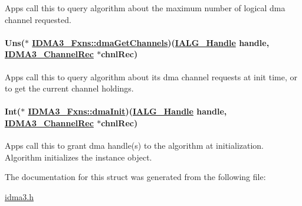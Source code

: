Apps call this to query algorithm about the maximum number of logical dma channel requested. 

\hypertarget{struct_i_d_m_a3___fxns_91d2edc4e5202ab46028a272cf8f7ad6}{
\paragraph[dmaGetChannels]{\setlength{\rightskip}{0pt plus 5cm}Uns($\ast$ \hyperlink{struct_i_d_m_a3___fxns_91d2edc4e5202ab46028a272cf8f7ad6}{IDMA3\_\-Fxns::dma\-Get\-Channels})(\hyperlink{struct_i_a_l_g___obj}{IALG\_\-Handle} handle, \hyperlink{struct_i_d_m_a3___channel_rec}{IDMA3\_\-Channel\-Rec} $\ast$chnl\-Rec)}\hfill}
\label{struct_i_d_m_a3___fxns_91d2edc4e5202ab46028a272cf8f7ad6}


Apps call this to query algorithm about its dma channel requests at init time, or to get the current channel holdings. 

\hypertarget{struct_i_d_m_a3___fxns_080578d0edab90882b4fe8124c74eea2}{
\paragraph[dmaInit]{\setlength{\rightskip}{0pt plus 5cm}Int($\ast$ \hyperlink{struct_i_d_m_a3___fxns_080578d0edab90882b4fe8124c74eea2}{IDMA3\_\-Fxns::dma\-Init})(\hyperlink{struct_i_a_l_g___obj}{IALG\_\-Handle} handle, \hyperlink{struct_i_d_m_a3___channel_rec}{IDMA3\_\-Channel\-Rec} $\ast$chnl\-Rec)}\hfill}
\label{struct_i_d_m_a3___fxns_080578d0edab90882b4fe8124c74eea2}


Apps call this to grant dma handle(s) to the algorithm at initialization. Algorithm initializes the instance object. 



The documentation for this struct was generated from the following file:\begin{CompactItemize}
\item 
\hyperlink{idma3_8h}{idma3.h}\end{CompactItemize}
